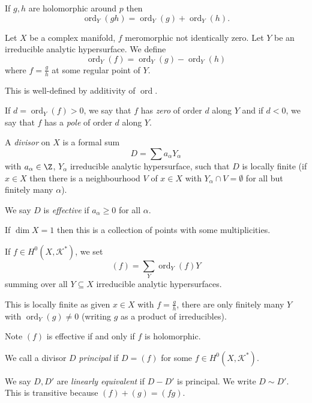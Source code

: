 \documentclass[a4paper]{article}
\DeclareMathOperator{\ord}{ord} %
\begin{document}
If \(g, h\) are holomorphic around \(p\) then
\[
  \ord_Y (gh) = \ord_Y (g) + \ord_Y (h).
\]

\begin{definition}[order]
  Let \(X\) be a complex manifold, \(f\) meromorphic not identically zero. Let \(Y\) be an irreducible analytic hypersurface. We define
  \[
    \ord_Y(f) = \ord_Y(g) - \ord_Y(h)
  \]
  where \(f = \frac{g}{h}\) at some regular point of \(Y\).
\end{definition}
This is well-defined by additivity of \(\ord\).

If \(d = \ord_Y(f) > 0\), we say that \(f\) has \emph{zero} of order \(d\) along \(Y\) and if \(d < 0\), we say that \(f\) has a \emph{pole} of order \(d\) along \(Y\).

\begin{definition}[divisor]
  A \emph{divisor} on \(X\) is a formal sum
  \[
    D = \sum a_\alpha Y_\alpha
  \]
  with \(a_\alpha \in \Z\), \(Y_\alpha\) irreducible analytic hypersurface, such that \(D\) is locally finite (if \(x \in X\) then there is a neighbourhood \(V\) of \(x \in X\) with \(Y_\alpha \cap V = \emptyset\) for all but finitely many \(\alpha\)).

  We say \(D\) is \emph{effective} if \(a_\alpha \geq 0\) for all \(\alpha\).
\end{definition}

\begin{eg}
  If \(\dim X = 1\) then this is a collection of points with some multiplicities.
\end{eg}

\begin{definition}
  If \(f \in H^0(X, \mathcal K^*)\), we set
  \[
    (f) = \sum_Y \ord_Y(f) Y
  \]
  summing over all \(Y \subseteq X\) irreducible analytic hypersurfaces.
\end{definition}
This is locally finite as given \(x \in X\) with \(f = \frac{g}{h}\), there are only finitely many \(Y\) with \(\ord_Y(g) \neq 0\) (writing \(g\) as a product of irreducibles).

Note \((f)\) is effective if and only if \(f\) is holomorphic.

\begin{definition}
  We call a divisor \(D\) \emph{principal} if \(D = (f)\) for some \(f \in H^0(X, \mathcal K^*)\).

  We say \(D, D'\) are \emph{linearly equivalent} if \(D - D'\) is principal. We write \(D \sim D'\). This is transitive because \((f) + (g) = (fg)\).
\end{definition}
\end{document}
